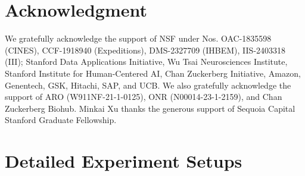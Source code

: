 \section*{Acknowledgment}

We gratefully acknowledge the support of NSF under Nos. OAC-1835598 (CINES), CCF-1918940 (Expeditions), DMS-2327709 (IHBEM), IIS-2403318 (III); Stanford Data Applications Initiative, Wu Tsai Neurosciences Institute, Stanford Institute for Human-Centered AI, Chan Zuckerberg Initiative, Amazon, Genentech, GSK, Hitachi, SAP, and UCB.
We also gratefully acknowledge the support of ARO (W911NF-21-1-0125), ONR (N00014-23-1-2159), and Chan Zuckerberg Biohub.
Minkai Xu thanks the generous support of Sequoia Capital Stanford Graduate Fellowship.




\newpage
\appendix
\section{Detailed Experiment Setups}\label{appendix:setups}


